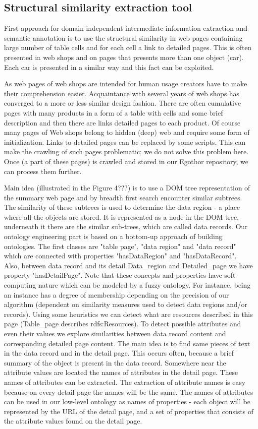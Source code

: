 \documentclass{sig-alternate}
\begin{document}
\subsection{Structural similarity extraction tool}
First approach for domain independent intermediate information extraction and semantic annotation is to use the structural similarity in web pages containing large number of table cells and for each cell a link to detailed pages. This is often presented in web shops and on pages that presents more than one object (car). Each car is presented in a similar way and this fact can be exploited.

As web pages of web shops are intended for human usage creators have to make their comprehension easier. Acquaintance with several years of web shops has converged to a more or less similar design fashion. There are often cumulative pages with many products in a form of a table with cells and some brief description and then there are links detailed pages to each product. Of course many pages of Web shops belong to hidden (deep) web and require some form of initialization. Links to detailed pages can be replaced by some scripts. This can make the crawling of such pages problematic; we do not solve this problem here. Once (a part of these pages) is crawled and stored in our Egothor repository, we can process them further. 

Main idea (illustrated in the Figure 4???) is to use a DOM tree representation of the summary web page and by breadth first search encounter similar subtrees. The similarity of these subtrees is used to determine the data region - a place where all the objects are stored. It is represented as a node in the DOM tree, underneath it there are the similar sub-trees, which are called data records. Our ontology engineering part is based on a bottom-up approach of building ontologies. The first classes are "table page", "data region" and "data record" which are connected with properties "hasDataRegion" and "hasDataRecord". Also, between data record and its detail Data\_region and Detailed\_page we have property "hasDetailPage". Note that these concepts and properties have soft computing nature which can be modeled by a fuzzy ontology. For instance, being an instance has a degree of membership depending on the precision of our algorithm (dependent on similarity measures used to detect data regions and/or records). Using some heuristics we can detect what are resources described in this page (Table\_page describes rdfs:Resources). To detect possible attributes and even their values we explore similarities between data record content and corresponding detailed page content. The main idea is to find same pieces of text in the data record and in the detail page. This occurs often, because a brief summary of the object is present in the data record. Somewhere near the attribute values are located the names of attributes in the detail page. These names of attributes can be extracted. The extraction of attribute names is easy because on every detail page the names will be the same.  The names of attributes can be used in our low-level ontology as names of properties - each object will be represented by the URL of the detail page, and a set of properties that consists of the attribute values found on the detail page.
\end{document}
